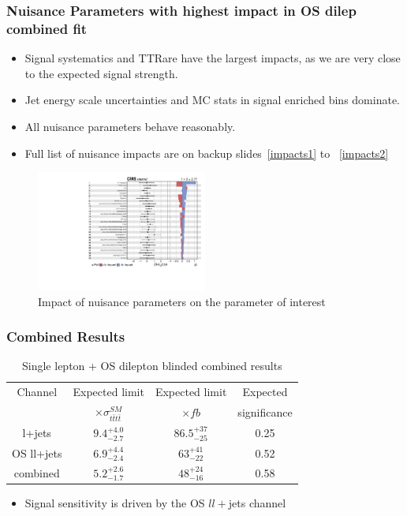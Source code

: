 \documentclass{beamer}
\begin{document}

\begin{frame}
\frametitle{Nuisance Parameters with highest impact in OS dilep combined fit}
\vspace{-5pt}
\begin{itemize}
	\item {\small Signal systematics and TTRare have the largest impacts, as we are very close to the expected signal strength.}
	\item {\small Jet energy scale uncertainties and MC stats in signal enriched bins dominate.}
	\item {\small All nuisance parameters behave reasonably.}
	\item {\small Full list of nuisance impacts are on backup slides~\ref{impacts1} to ~\ref{impacts2}}
\end{itemize}
\vspace{-5pt}
\begin{figure}
	\includegraphics[width=0.5\textwidth]{impacts1.pdf}
	\vspace{-10pt} \caption{Impact of nuisance parameters on the parameter of interest}
\end{figure}
\end{frame}


\begin{frame}
\frametitle{Combined Results}

\begin{table}
\caption{Single lepton + OS dilepton blinded combined results}
\vspace{0pt} 
\begin{tabular}{| c | c | c | c |}
\hline
Channel	&Expected limit	&Expected limit	&Expected \\
 & $\times \sigma_{t\bar{t}t\bar{t}}^{SM}$ &  $\times fb$ &significance \\
\hline
l+jets	& $9.4^{+4.0}_{-2.7}$ & $86.5^{+37}_{-25}$ & 0.25 \\
\hline
OS ll+jets		&$6.9_{-2.4}^{+4.4}$ &$63_{-22}^{+41}$ & 0.52  \\
\hline
combined &$5.2_{-1.7}^{+2.6}$ &$48_{-16}^{+24}$ & 0.58 \\
\hline
\end{tabular} 
\end{table}
\begin{itemize}
\item Signal sensitivity is driven by the OS $ll+$jets channel
\end{itemize}
\end{frame}
\end{document}

